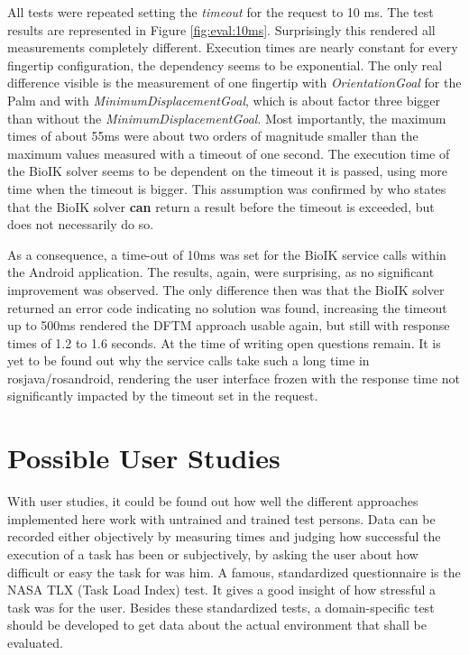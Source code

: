 All tests were repeated setting the \textit{timeout} for the request to 10 ms. The test results are represented in Figure \ref{fig:eval:10ms}. Surprisingly this rendered all measurements completely different. Execution times are nearly constant for every fingertip configuration, the dependency seems to be exponential. The only real difference visible is the measurement of one fingertip with \textit{OrientationGoal} for the Palm and with \textit{MinimumDisplacementGoal}, which is about factor three bigger than without the \textit{MinimumDisplacementGoal}. Most importantly, the maximum times of about 55ms were about two orders of magnitude smaller than the maximum values measured with a timeout of one second. The execution time of the BioIK solver seems to be dependent on the timeout it is passed, using more time when the timeout is bigger. This assumption was confirmed by \citeauthor{Ruppel17}\cite{Ruppel17} who states that the BioIK solver \textbf{can} return a result before the timeout is exceeded, but does not necessarily do so.

As a consequence, a time-out of 10ms was set for the BioIK service calls within the Android application. The results, again, were surprising, as no significant improvement was observed. The only difference then was that the BioIK solver returned an error code indicating no solution was found, increasing the timeout up to 500ms rendered the DFTM approach usable again, but still with response times of 1.2 to 1.6 seconds. At the time of writing open questions remain. It is yet to be found out why the service calls take such a long time in rosjava/rosandroid, rendering the user interface frozen with the response time not significantly impacted by the timeout set in the request.

\section{Possible User Studies}

With user studies, it could be found out how well the different approaches implemented here work with untrained and trained test persons. Data can be recorded either objectively by measuring times and judging how successful the execution of a task has been or subjectively, by asking the user about how difficult or easy the task for was him. A famous, standardized questionnaire is the NASA TLX (Task Load Index) test\cite{Hart1988}. It gives a good insight of how stressful a task was for the user. Besides these standardized tests, a domain-specific test should be developed to get data about the actual environment that shall be evaluated.

